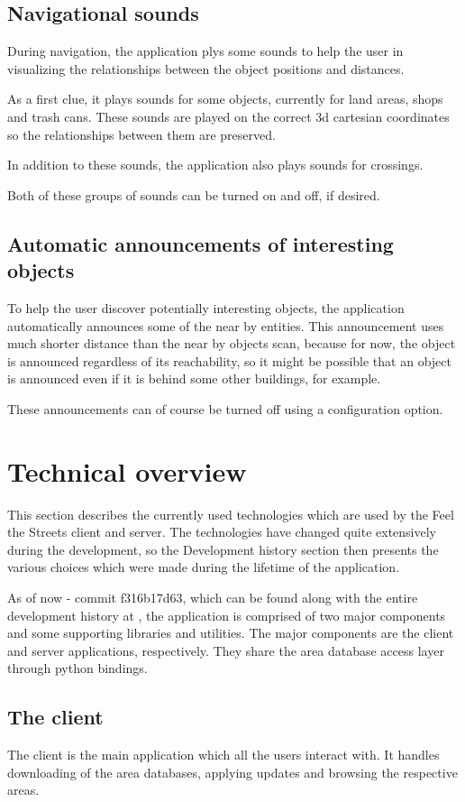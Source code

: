 \documentclass[nolof,digital]{fithesis3}
\begin{document}
\subsection{Navigational sounds}
During navigation, the application plys some sounds to help the user in visualizing the relationships between the object positions and distances.

As a first clue, it plays sounds for some objects, currently for land areas, shops and trash cans. These sounds are played on the correct 3d cartesian coordinates so the relationships between them are preserved.

In addition to these sounds, the application also plays sounds for crossings.

Both of these groups of sounds can be turned on and off, if desired.
\subsection{Automatic announcements of interesting objects}
To help the user discover potentially interesting objects, the application automatically announces some of the near by entities. This announcement uses much shorter distance than the near by objects scan, because for now, the object is announced regardless of its reachability, so it might be possible that an object is announced even if it is behind some other buildings, for example.

These announcements can of course be turned off using a configuration option.
\section{Technical overview}
This section describes the currently used technologies which are used by the Feel the Streets client and server. The technologies have changed quite extensively during the development, so the Development history section then presents the various choices which were made during the lifetime of the application.

As of now - commit f316b17d63, which can be found along with the entire development history at \parencite{fts_repo}, the application is comprised of two major components and some supporting libraries and utilities. The major components are the client and server applications, respectively. They share the area database access layer through python bindings.
\subsection{The client}
The client is the main application which all the users interact with. It handles downloading of the area databases, applying updates and browsing the respective areas.
\end{document}
